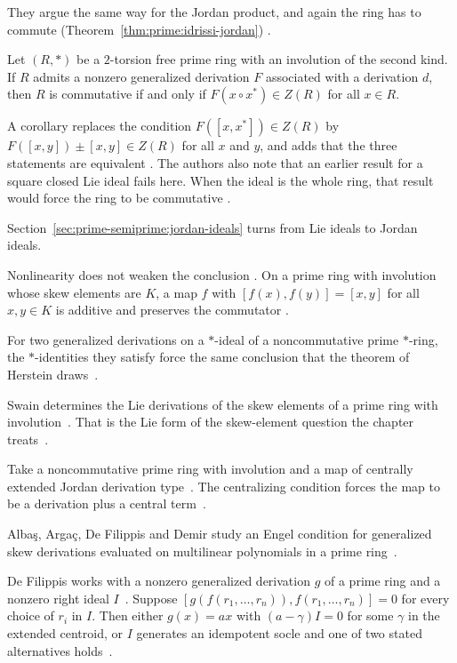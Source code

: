 They argue the same way for the Jordan product, and again the ring has to commute (Theorem~\ref{thm:prime:idrissi-jordan})
\cite[p.~1950001-6]{Idrissi2019}.\begin{theorem}\label{thm:prime:idrissi-jordan}
Let $(R,*)$ be a $2$-torsion free prime ring with an involution of the second kind.
If $R$ admits a nonzero generalized derivation $F$ associated with a derivation $d$,
then $R$ is commutative if and only if $F(x\circ x^{*})\in Z(R)$ for all $x\in R$.
\end{theorem}

A corollary replaces the condition $F([x,x^{*}])\in Z(R)$ by
$F([x,y])\pm[x,y]\in Z(R)$ for all $x$ and $y$, and adds that the three
statements are equivalent \cite[Corollary~1, p.~1950001-5]{Idrissi2019}. The
authors also note that an earlier result for a square closed Lie ideal fails
here. When the ideal is the whole ring, that result would force the ring to be
commutative \cite[p.~1950001-5]{Idrissi2019}.

Section~\ref{sec:prime-semiprime:jordan-ideals} turns from Lie ideals to
Jordan ideals.

Nonlinearity does not weaken the conclusion
\cite[Abstract]{NonlinearStrongCommuting2012}. On a prime ring with involution
whose skew elements are $K$, a map $f$ with $[f(x),f(y)]=[x,y]$ for all
$x,y\in K$ is additive and preserves the commutator
\cite[Abstract]{NonlinearStrongCommuting2012}.

For two generalized derivations on a $*$-ideal of a noncommutative prime
$*$-ring, the $*$-identities they satisfy force the same conclusion that the theorem
of Herstein draws~\cite{WlHersteinsTheorem2023}.

Swain determines the Lie derivations of the skew elements of a prime
ring with involution~\cite{WlLieDerivationsOfTheSkewElement1996}. That is the Lie form of the skew-element question the
chapter treats~\cite{WlLieDerivationsOfTheSkewElement1996}.

Take a noncommutative prime ring with involution and a map of centrally
extended Jordan derivation type~\cite{WlCentrallyExtendedJordanDerivat2019}. The centralizing condition forces
the map to be a derivation plus a central
term~\cite{WlCentrallyExtendedJordanDerivat2019}.

Alba\c{s}, Arga\c{c}, De Filippis and Demir study an Engel condition for
generalized skew derivations evaluated on multilinear polynomials in a prime
ring~\cite{WlAnEngelConditionWithGeneralize2018}.

De Filippis works with a nonzero generalized derivation $g$ of a prime ring
and a nonzero right ideal $I$~\cite{WlAnEngelConditionWithGeneralize2007}. Suppose
$[g(f(r_1,\dots,r_n)),f(r_1,\dots,r_n)]=0$ for every choice of $r_i$ in $I$.
Then either $g(x)=ax$ with $(a-\gamma)I=0$ for some $\gamma$ in the extended
centroid, or $I$ generates an idempotent socle and one of two stated
alternatives holds~\cite{WlAnEngelConditionWithGeneralize2007}.
